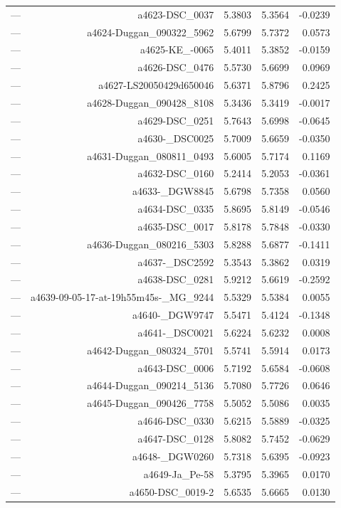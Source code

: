 \begin{table}[htbp]
\begin{tabular}{lrrrr}
— & a4623-DSC_0037 & 5.3803 & 5.3564 & -0.0239 \\
— & a4624-Duggan_090322_5962 & 5.6799 & 5.7372 & 0.0573 \\
— & a4625-KE_-0065 & 5.4011 & 5.3852 & -0.0159 \\
— & a4626-DSC_0476 & 5.5730 & 5.6699 & 0.0969 \\
— & a4627-LS20050429d650046 & 5.6371 & 5.8796 & 0.2425 \\
— & a4628-Duggan_090428_8108 & 5.3436 & 5.3419 & -0.0017 \\
— & a4629-DSC_0251 & 5.7643 & 5.6998 & -0.0645 \\
— & a4630-_DSC0025 & 5.7009 & 5.6659 & -0.0350 \\
— & a4631-Duggan_080811_0493 & 5.6005 & 5.7174 & 0.1169 \\
— & a4632-DSC_0160 & 5.2414 & 5.2053 & -0.0361 \\
— & a4633-_DGW8845 & 5.6798 & 5.7358 & 0.0560 \\
— & a4634-DSC_0335 & 5.8695 & 5.8149 & -0.0546 \\
— & a4635-DSC_0017 & 5.8178 & 5.7848 & -0.0330 \\
— & a4636-Duggan_080216_5303 & 5.8288 & 5.6877 & -0.1411 \\
— & a4637-_DSC2592 & 5.3543 & 5.3862 & 0.0319 \\
— & a4638-DSC_0281 & 5.9212 & 5.6619 & -0.2592 \\
— & a4639-09-05-17-at-19h55m45s-_MG_9244 & 5.5329 & 5.5384 & 0.0055 \\
— & a4640-_DGW9747 & 5.5471 & 5.4124 & -0.1348 \\
— & a4641-_DSC0021 & 5.6224 & 5.6232 & 0.0008 \\
— & a4642-Duggan_080324_5701 & 5.5741 & 5.5914 & 0.0173 \\
— & a4643-DSC_0006 & 5.7192 & 5.6584 & -0.0608 \\
— & a4644-Duggan_090214_5136 & 5.7080 & 5.7726 & 0.0646 \\
— & a4645-Duggan_090426_7758 & 5.5052 & 5.5086 & 0.0035 \\
— & a4646-DSC_0330 & 5.6215 & 5.5889 & -0.0325 \\
— & a4647-DSC_0128 & 5.8082 & 5.7452 & -0.0629 \\
— & a4648-_DGW0260 & 5.7318 & 5.6395 & -0.0923 \\
— & a4649-Ja_Pe-58 & 5.3795 & 5.3965 & 0.0170 \\
— & a4650-DSC_0019-2 & 5.6535 & 5.6665 & 0.0130 \\

\end{tabular}
\end{table}
